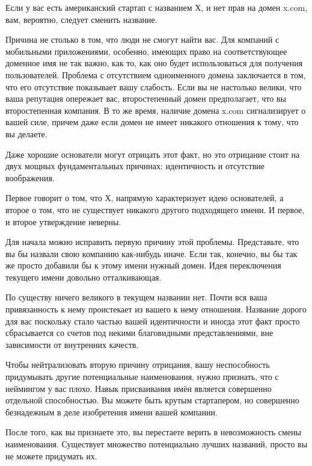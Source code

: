 \documentclass[ebook,12pt,oneside,openany]{memoir}
\begin{document}
\maketitle

Если у вас есть американский стартап с названием Х, и нет прав на
домен x.com, вам, вероятно, следует сменить название.

Причина не столько в том, что люди не смогут найти вас. Для компаний с
мобильными приложениями, особенно, имеющих право на соответствующее
доменное имя не так важно, как то, как оно будет использоваться для
получения пользователей. Проблема с отсутствием одноименного домена
заключается в том, что его отсутствие показывает вашу слабость. Если
вы не настолько велики, что ваша репутация опережает вас,
второстепенный домен предполагает, что вы второстепенная компания. В
то же время, наличие домена x.com сигнализирует о вашей силе, причем
даже если домен не имеет никакого отношения к тому, что вы делаете.

Даже хорошие основатели могут отрицать этот факт, но это отрицание
стоит на двух мощных фундаментальных причинах: идентичность и
отсутствие воображения.

Первое говорит о том, что Х, напрямую характеризует идею основателей,
а второе о том, что не существует никакого другого подходящего имени.
И первое, и второе утверждение неверны.

Для начала можно исправить первую причину этой проблемы. Представьте,
что вы бы назвали свою компанию как-нибудь иначе. Если так, конечно,
вы бы так же просто добавили бы к этому имени нужный домен. Идея
переключения текущего имени довольно отталкивающая.

По существу ничего великого в текущем названии нет. Почти вся ваша
привязанность к нему проистекает из вашего к нему отношения. Название
дорого для вас поскольку стало частью вашей идентичности и иногда этот
факт просто сбрасывается со счетов под некими благовидными
представлениями, вне зависимости от внутренних качеств.

Чтобы нейтрализовать вторую причину отрицания, вашу неспособность
придумывать другие потенциальные наименования, нужно признать, что с
неймингом у вас плохо. Навык присваивания имён является совершенно
отдельной способностью. Вы можете быть крутым стартапером, но
совершенно безнадежным в деле изобретения имени вашей компании.

После того, как вы признаете это, вы перестаете верить в невозможность
смены наименования. Существует множество потенциально лучших названий,
просто вы не можете придумать их.
\end{document}
